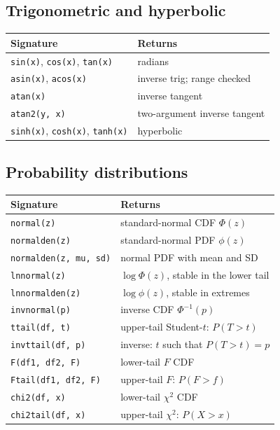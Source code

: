 \documentclass[11pt,letterpaper]{article}
\begin{document}
\subsection{Trigonometric and hyperbolic}

\begin{center}
\begin{tabular}{ll}
\toprule
Signature & Returns \\
\midrule
\texttt{sin(x)}, \texttt{cos(x)}, \texttt{tan(x)} & radians \\
\texttt{asin(x)}, \texttt{acos(x)} & inverse trig; range checked \\
\texttt{atan(x)} & inverse tangent \\
\texttt{atan2(y, x)} & two-argument inverse tangent \\
\texttt{sinh(x)}, \texttt{cosh(x)}, \texttt{tanh(x)} & hyperbolic \\
\bottomrule
\end{tabular}
\end{center}

\subsection{Probability distributions}

\begin{center}
\begin{tabular}{ll}
\toprule
Signature & Returns \\
\midrule
\texttt{normal(z)} & standard-normal CDF $\Phi(z)$ \\
\texttt{normalden(z)} & standard-normal PDF $\phi(z)$ \\
\texttt{normalden(z, mu, sd)} & normal PDF with mean and SD \\
\texttt{lnnormal(z)} & $\log \Phi(z)$, stable in the lower tail \\
\texttt{lnnormalden(z)} & $\log \phi(z)$, stable in extremes \\
\texttt{invnormal(p)} & inverse CDF $\Phi^{-1}(p)$ \\
\texttt{ttail(df, t)} & upper-tail Student-$t$: $P(T > t)$ \\
\texttt{invttail(df, p)} & inverse: $t$ such that $P(T > t) = p$ \\
\texttt{F(df1, df2, F)} & lower-tail $F$ CDF \\
\texttt{Ftail(df1, df2, F)} & upper-tail $F$: $P(F > f)$ \\
\texttt{chi2(df, x)} & lower-tail $\chi^2$ CDF \\
\texttt{chi2tail(df, x)} & upper-tail $\chi^2$: $P(X > x)$ \\
\bottomrule
\end{tabular}
\end{center}
\end{document}
